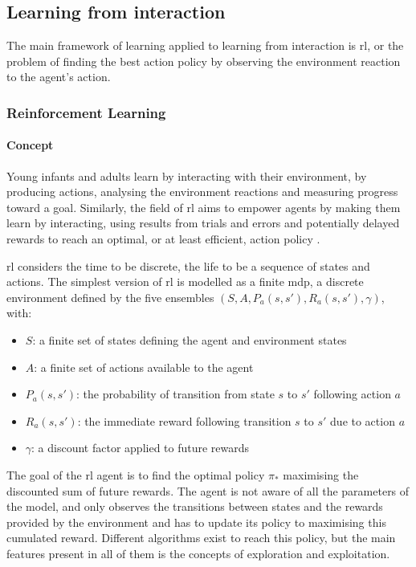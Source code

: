 \subsection{Learning from interaction}

The main framework of learning applied to learning from interaction is \acrlong{rl}, or the problem of finding the best action policy by observing the environment reaction to the agent's action.
\subsubsection{Reinforcement Learning} 	
	\paragraph{Concept}
	Young infants and adults learn by interacting with their environment, by producing actions, analysing the environment reactions and measuring progress toward a goal. Similarly, the field of \acrfull{rl} aims to empower agents by making them learn by interacting, using results from trials and errors and potentially delayed rewards to reach an optimal, or at least efficient, action policy \citep{sutton1998reinforcement}. 

	\gls{rl} considers the time to be discrete, the life to be a sequence of states and actions. The simplest version of \gls{rl} is modelled as a finite \acrfull{mdp}, a discrete environment defined by the five ensembles $(S, A, P_a(s,s'), R_a(s,s'), \gamma)$, with:
	\begin{itemize}
		\item $S$: a finite set of states defining the agent and environment states
		\item $A$: a finite set of actions available to the agent
		\item $P_a(s,s')$: the probability of transition from state $s$ to $s'$ following action $a$
		\item $R_a(s,s')$: the immediate reward following transition $s$ to $s'$ due to action $a$
		\item $\gamma$: a discount factor applied to future rewards
	\end{itemize}
	
	The goal of the \gls{rl} agent is to find the optimal policy $\pi_*$ maximising the discounted sum of future rewards. The agent is not aware of all the parameters of the model, and only observes the transitions between states and the rewards provided by the environment and has to update its policy to maximising this cumulated reward. Different algorithms exist to reach this policy, but the main features present in all of them is the concepts of exploration and exploitation.
	
